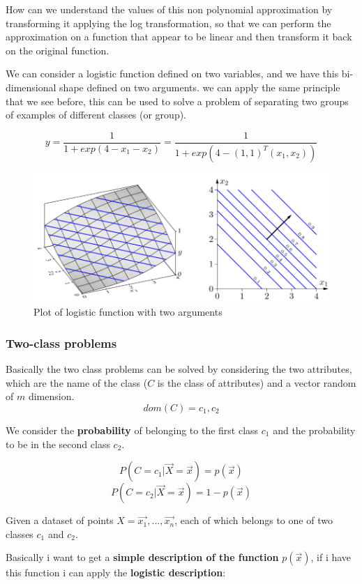 \documentclass{article}
\begin{document}
How can we understand the values of this non polynomial approximation by transforming it
applying the log transformation, so that we can perform the approximation on a
function that appear to be linear and then transform it back on the original function.

We can consider a logistic function defined on two variables, and we have this bi-dimensional
shape defined on two arguments. we can apply the same principle that we see before, this
can be used to solve a problem of separating two groups of examples of different classes (or
group).

$$y=\frac{1}{1+exp(4-x_1-x_2)}=\frac{1}{1+exp\left(4-(1,1)^T(x_1,x_2)\right)}$$
\begin{figure}[H]
    \centering
    \includegraphics[scale=0.45]{images/logist_bidiminesional_reg.png}
    \caption{Plot of logistic function with two arguments}
\end{figure}

\subsubsection{Two-class problems}
Basically the two class problems can be solved by considering the two attributes,
which are the name of the class ($C$ is the class of attributes) and a vector random of $m$ dimension.
$$dom(C)={c_1,c_2}$$

We consider the \textbf{probability} of belonging to the first class $c_1$
and the probability to be in the second class $c_2$.

$$P(C=c_1|\vec{X}=\vec{x})=p(\vec{x})$$
$$P(C=c_2|\vec{X}=\vec{x})=1-p(\vec{x})$$

Given a dataset of points $X={\vec{x_1},...,\vec{x_n}}$, each of which belongs to one
of two classes $c_1$ and $c_2$.

Basically i want to get a \textbf{simple description of the function} $p(\vec{x})$, if i have
this function i can apply the \textbf{logistic description}:
\end{document}
